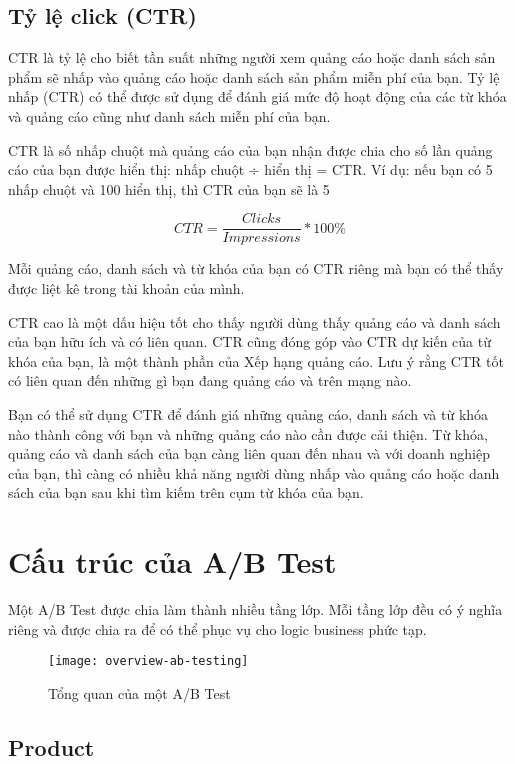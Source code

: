 \subsection{Tỷ lệ click (CTR)}

CTR là tỷ lệ cho biết tần suất những người xem quảng cáo hoặc danh sách sản phẩm sẽ nhấp vào quảng cáo hoặc danh sách sản phẩm miễn phí của bạn. Tỷ lệ nhấp (CTR) có thể được sử dụng để đánh giá mức độ hoạt động của các từ khóa và quảng cáo cũng như danh sách miễn phí của bạn.

CTR là số nhấp chuột mà quảng cáo của bạn nhận được chia cho số lần quảng cáo của bạn được hiển thị: nhấp chuột ÷ hiển thị = CTR. Ví dụ: nếu bạn có 5 nhấp chuột và 100 hiển thị, thì CTR của bạn sẽ là 5%

\begin{displaymath}
	CTR = \frac{Clicks}{Impressions} * 100\%
\end{displaymath}

Mỗi quảng cáo, danh sách và từ khóa của bạn có CTR riêng mà bạn có thể thấy được liệt kê trong tài khoản của mình.

CTR cao là một dấu hiệu tốt cho thấy người dùng thấy quảng cáo và danh sách của bạn hữu ích và có liên quan. CTR cũng đóng góp vào CTR dự kiến của từ khóa của bạn, là một thành phần của Xếp hạng quảng cáo. Lưu ý rằng CTR tốt có liên quan đến những gì bạn đang quảng cáo và trên mạng nào.

Bạn có thể sử dụng CTR để đánh giá những quảng cáo, danh sách và từ khóa nào thành công với bạn và những quảng cáo nào cần được cải thiện. Từ khóa, quảng cáo và danh sách của bạn càng liên quan đến nhau và với doanh nghiệp của bạn, thì càng có nhiều khả năng người dùng nhấp vào quảng cáo hoặc danh sách của bạn sau khi tìm kiếm trên cụm từ khóa của bạn.

\section{Cấu trúc của A/B Test}

Một A/B Test được chia làm thành nhiều tầng lớp. Mỗi tầng lớp đều có ý nghĩa riêng và được chia ra để có thể phục vụ cho logic business phức tạp.

\begin{figure}[H]
	\centering
	\texttt{[image: overview-ab-testing]}
	\caption{Tổng quan của một A/B Test}
\end{figure}

\subsection{Product}

